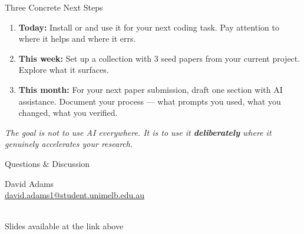 \begin{frame}{Three Concrete Next Steps}
  \begin{enumerate}
    \item \textbf{Today:} Install  or  and use it for your next coding task. Pay attention to where it helps and where it errs.

    \vspace{0.6em}
    \item \textbf{This week:} Set up a  collection with 3 seed papers from your current project. Explore what it surfaces.

    \vspace{0.6em}
    \item \textbf{This month:} For your next paper submission, draft one section with AI assistance. Document your process — what prompts you used, what you changed, what you verified.
  \end{enumerate}

  \vspace{0.8em}
  \begin{center}
    \small\textit{The goal is not to use AI everywhere. It is to use it \textbf{deliberately} where it genuinely accelerates your research.}
  \end{center}
\end{frame}

\begin{frame}[standout]
  \Large Questions \& Discussion

  \vspace{1.5em}
  \normalsize
  David Adams\\
  \href{mailto:david.adams1@student.unimelb.edu.au}{david.adams1@student.unimelb.edu.au}

  \vspace{1.2em}
  \\[0.4em]
  \small Slides available at the link above
\end{frame}
